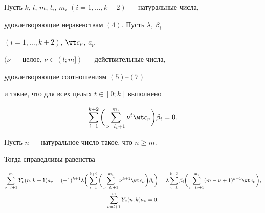 \begin{lem}


Пусть $k$, $l$, $m$, $l_i$, $m_i$ $(i=1, \dotsc, k+2)$ --- натуральные числа, 


удовлетворяющие неравенствам $(4)$. Пусть $\lambda$, $\beta_i$


$(i=1, \dotsc, k+2)$, $\wt c_{\nu}$, $a_{\nu}$ 


$(\nu$ --- целое, $\nu\in(l; m])$ --- действительные числа,


удовлетворяющие соотношениям $(5)$--$(7)$ 


и такие, что для всех целых $t \in [0; k]$ выполнено


\begin{equation}


\sum_{i=1}^{k+2} \bigg(\sum_{\nu=l_i+1}^{m_i} \nu^t \wt c_{\nu}\bigg)\beta_i=0.


\end{equation}


Пусть $n$ --- натуральное число такое, что $n \ge m$.


Тогда справедливы равенства


\begin{gather}


\sum_{\nu=l+1}^m Y_{\nu}(n, k+1) a_{\nu}=(-1)^{k+1} \lambda


\bigg(\sum_{i=1}^{k+2} \bigg(\sum_{\nu=l_i+1}^{m_i} \nu^{k+1}


\wt c_{\nu}\bigg) \beta_i\bigg)=


% 


\lambda \sum_{i=1}^{k+2} \beta_i\bigg(\sum_{\nu=l_i+1}^{m_i}


(m-\nu+1)^{k+1} \wt c_{\nu}\bigg),\\


%


\sum_{\nu=l+1}^m Y_{\nu}(n, k) a_{\nu}=0.


\end{gather}


\end{lem}








